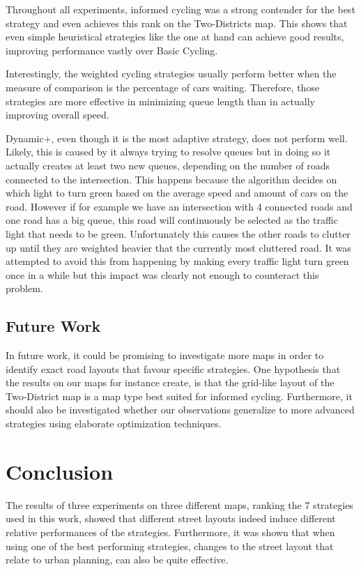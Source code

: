 \documentclass[11pt]{article}
\begin{document}
Throughout all experiments, informed cycling was a strong contender for the best strategy and even achieves this rank on the Two-Districts map. This shows that even simple heuristical strategies like the one at hand can achieve good results, improving performance vastly over Basic Cycling.

Interestingly, the weighted cycling strategies usually perform better when the measure of comparison is the percentage of cars waiting. Therefore, those strategies are more effective in minimizing queue length than in actually improving overall speed.

Dynamic+, even though it is the most adaptive strategy, does not perform well. Likely, this is caused by it always trying to resolve queues but in doing so it actually creates at least two new queues, depending on the number of roads connected to the intersection. This happens because the algorithm decides on which light to turn green based on the average speed and amount of cars on the road. However if for example we have an intersection with 4 connected roads and one road has a big queue, this road will continuously be selected as the traffic light that needs to be green. Unfortunately this causes the other roads to clutter up until they are weighted heavier that the currently most cluttered road. It was attempted to avoid this from happening by making every traffic light turn green once in a while but this impact was clearly not enough to counteract this problem.

\subsection{Future Work}
In future work, it could be promising to investigate more maps in order to identify exact road layouts that favour specific strategies. One hypothesis that the results on our maps for instance create, is that the grid-like layout of the Two-District map is a map type best suited for informed cycling. Furthermore, it should also be investigated whether our observations generalize to more advanced strategies using elaborate optimization techniques.

\section{Conclusion}
\label{sec:conclusion}
The results of three experiments on three different maps, ranking the 7 strategies used in this work, showed that different street layouts indeed induce different relative performances of the strategies. Furthermore, it was shown that when using one of the best performing strategies, changes to the street layout that relate to urban planning, can also be quite effective.
\end{document}
